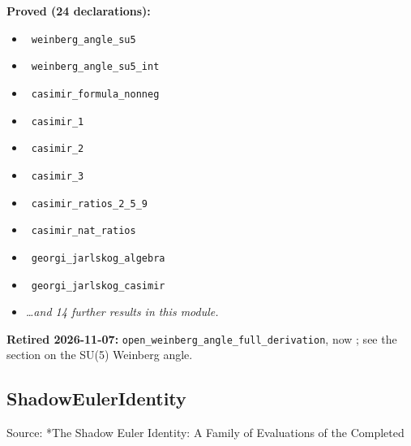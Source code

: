 \documentclass{report}
\theoremstyle{definition}
\begin{document}
\begin{itemize}
\begin{itemize}
\noindent\textbf{Proved (24 declarations):}
\begin{itemize}
  \item {}\leanok\ \texttt{weinberg\_angle\_su5}
  \item {}\leanok\ \texttt{weinberg\_angle\_su5\_int}
  \item {}\leanok\ \texttt{casimir\_formula\_nonneg}
  \item {}\leanok\ \texttt{casimir\_1}
  \item {}\leanok\ \texttt{casimir\_2}
  \item {}\leanok\ \texttt{casimir\_3}
  \item {}\leanok\ \texttt{casimir\_ratios\_2\_5\_9}
  \item {}\leanok\ \texttt{casimir\_nat\_ratios}
  \item {}\leanok\ \texttt{georgi\_jarlskog\_algebra}
  \item {}\leanok\ \texttt{georgi\_jarlskog\_casimir}
  \item \emph{\ldots and 14 further results in this module.}
\end{itemize}
\noindent\textbf{Retired 2026-11-07:} \texttt{open\_weinberg\_angle\_full\_derivation}, now \leanok; see the section on the SU(5) Weinberg angle.

\subsection{ShadowEulerIdentity}
Source: *The Shadow Euler Identity: A Family of Evaluations of the Completed


\end{itemize}
\end{itemize}
\end{document}
